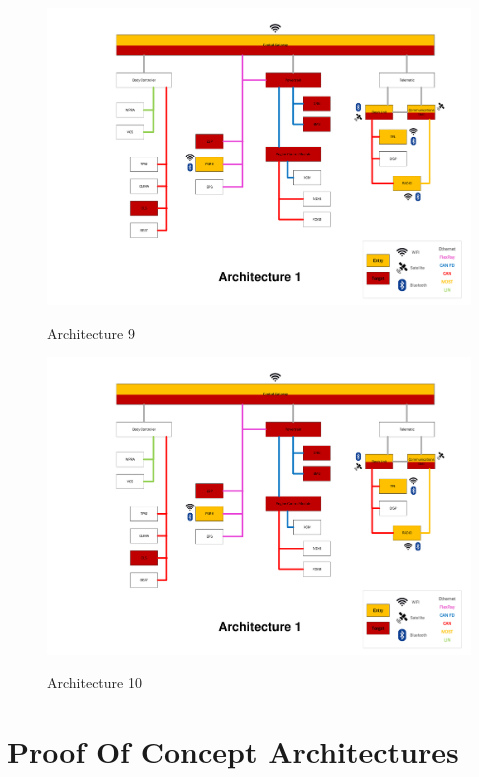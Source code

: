 \begin{figure}[h]
    \centering
    \caption{Architecture 9}
    \includegraphics[width=\textwidth, page=9]{../Architectures-survey.pdf}
    \label{fig:architecture9}
\end{figure}

\begin{figure}[h]
    \centering
    \caption{Architecture 10}
    \includegraphics[width=\textwidth, page=10]{../Architectures-survey.pdf}
    \label{fig:architecture10}
\end{figure}


\chapter{Proof Of Concept Architectures}
\label{fig:pocarch}

